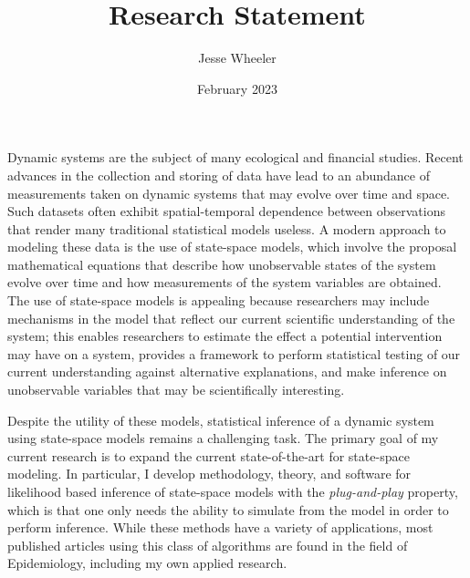 \documentclass{article}
\title{Research Statement}
\author{Jesse Wheeler}
\date{February 2023}
\begin{document}
\rule{0mm}{1mm}
\vspace{-20mm}


\vspace{1mm}

\rule{0mm}{1mm}

\vspace{3mm}
\rule{0mm}{1mm}

\vspace{4mm}

Dynamic systems are the subject of many ecological and financial studies.
Recent advances in the collection and storing of data have lead to an abundance of measurements taken on dynamic systems that may evolve over time and space.
Such datasets often exhibit spatial-temporal dependence between observations that render many traditional statistical models useless.
A modern approach to modeling these data is the use of state-space models, which involve the proposal mathematical equations that describe how unobservable states of the system evolve over time and how measurements of the system variables are obtained.
The use of state-space models is appealing because researchers may include mechanisms in the model that reflect our current scientific understanding of the system;
this enables researchers to estimate the effect a potential intervention may have on a system, provides a framework to perform statistical testing of our current understanding against alternative explanations, and make inference on unobservable variables that may be scientifically interesting.

Despite the utility of these models, statistical inference of a dynamic system using state-space models remains a challenging task.
The primary goal of my current research is to expand the current state-of-the-art for state-space modeling. In particular, I develop methodology, theory, and software for likelihood based inference of state-space models with the {\it plug-and-play} property, which is that one only needs the ability to simulate from the model in order to perform inference.
While these methods have a variety of applications, most published articles using this class of algorithms are found in the field of Epidemiology, including my own applied research.
\end{document}
